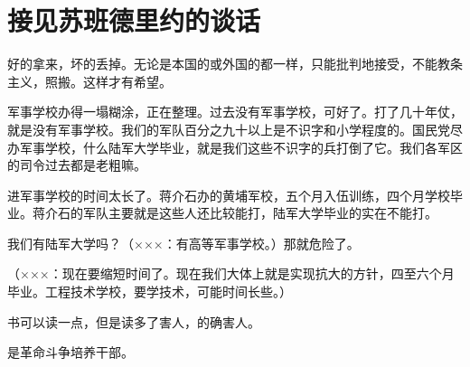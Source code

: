 \section[接见苏班德里约的谈话（一九六五年一月二十七日）]{接见苏班德里约的谈话}


好的拿来，坏的丢掉。无论是本国的或外国的都一样，只能批判地接受，不能教条主义，照搬。这样才有希望。

军事学校办得一塌糊涂，正在整理。过去没有军事学校，可好了。打了几十年仗，就是没有军事学校。我们的军队百分之九十以上是不识字和小学程度的。国民党尽办军事学校，什么陆军大学毕业，就是我们这些不识字的兵打倒了它。我们各军区的司令过去都是老粗嘛。

进军事学校的时间太长了。蒋介石办的黄埔军校，五个月入伍训练，四个月学校毕业。蒋介石的军队主要就是这些人还比较能打，陆军大学毕业的实在不能打。

我们有陆军大学吗？（×××：有高等军事学校。）那就危险了。

（×××：现在要缩短时间了。现在我们大体上就是实现抗大的方针，四至六个月毕业。工程技术学校，要学技术，可能时间长些。）

书可以读一点，但是读多了害人，的确害人。

是革命斗争培养干部。


